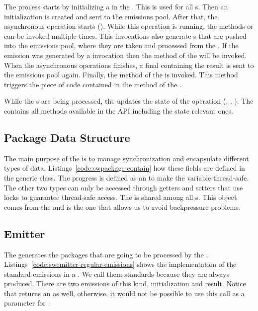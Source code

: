 \documentclass[type=bsc,accentcolor=tud9c]{tudthesis}
\begin{document}
The process starts by initializing a  in the . This  is used for all s. Then an initialization  is created and sent to the emissions pool. After that, the asynchronous operation starts (). While this operation is running, the methods  or  can be invoked multiple times. This invocations also generate s that are pushed into the emissions pool, where they are taken and processed from the . If the emission was generated by a  invocation then the  method of the  will be invoked. When the asynchronous operations finishes, a final  containing the result is sent to the emissions pool again. Finally, the  method of the  is invoked. This method triggers the piece of code contained in the  method of the .

While the s are being processed, the  updates the state of the operation (, , ). The  contains all methods available in the  API including the state relevant ones.

\subsection{Package Data Structure}
\label{sec:imp-package}
The main purpose of the  is to manage synchronization and encapsulate different types of data. Listings~\ref{code:swpackage-contain} how these fields are defined in the generic class. The progress is defined as an  to make the variable thread-safe. The other two types can only be accessed through getters and setters that use locks to guarantee thread-safe access. The  is shared among all s. This object comes from the  and is the one that allows us to avoid backpressure problems.



\subsection{Emitter}
\label{sec:imp-emitter}
The  generates the packages that are going to be processed by the . Listings~\ref{code:swemitter-regular-emissions} shows the implementation of the standard emissions in a . We call them standards because they are always produced. There are two emissions of this kind, initialization and result. Notice that  returns an  as well, otherwise, it would not be possible to use this call as a parameter for .
\end{document}
